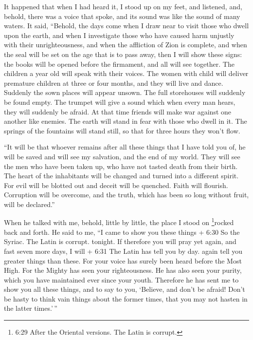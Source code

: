  It happened that when I had heard it, I stood up on my
feet, and listened, and, behold, there was a voice that spoke, and its
sound was like the sound of many waters.  It said,
``Behold, the days come when I draw near to visit those who dwell upon
the earth,  and when I investigate those who have caused
harm unjustly with their unrighteousness, and when the affliction of
Zion is complete,  and when the seal will be set on the age
that is to pass away, then I will show these signs: the books will be
opened before the firmament, and all will see together. 
The children a year old will speak with their voices. The women with
child will deliver premature children at three or four months, and they
will live and dance.  Suddenly the sown places will appear
unsown. The full storehouses will suddenly be found empty. 
The trumpet will give a sound which when every man hears, they will
suddenly be afraid.  At that time friends will make war
against one another like enemies. The earth will stand in fear with
those who dwell in it. The springs of the fountains will stand still, so
that for three hours they won't flow.

 ``It will be that whoever remains after all these things
that I have told you of, he will be saved and will see my salvation, and
the end of my world.  They will see the men who have been
taken up, who have not tasted death from their birth. The heart of the
inhabitants will be changed and turned into a different spirit.
 For evil will be blotted out and deceit will be quenched.
 Faith will flourish. Corruption will be overcome, and the
truth, which has been so long without fruit, will be declared.''

 When he talked with me, behold, little by little, the
place I stood on \footnote{6:29 After the Oriental versions. The Latin
  is corrupt.}rocked back and forth.  He said to me, ``I
came to show you these things + 6:30 So the Syriac. The Latin is
corrupt. tonight.  If therefore you will pray yet again,
and fast seven more days, I will + 6:31 The Latin has tell you by day.
again tell you greater things than these.  For your voice
has surely been heard before the Most High. For the Mighty has seen your
righteousness. He has also seen your purity, which you have maintained
ever since your youth.  Therefore he has sent me to show
you all these things, and to say to you, `Believe, and don't be afraid!
 Don't be hasty to think vain things about the former
times, that you may not hasten in the latter times.'\,''

